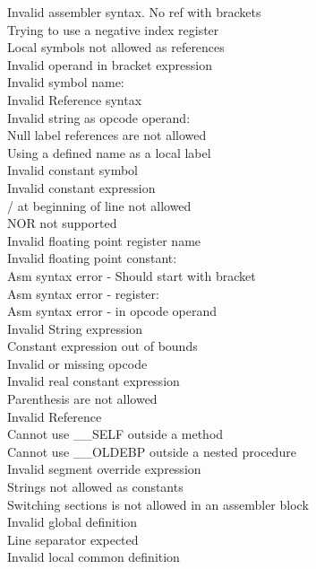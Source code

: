 \begin{description}
\item [Invalid assembler syntax. No ref with brackets]
\item [ Trying to use a negative index register ]
\item [ Local symbols not allowed as references ]
\item [ Invalid operand in bracket expression ]
\item [ Invalid symbol name:  ]
\item [ Invalid Reference syntax ]
\item [ Invalid string as opcode operand: ]
\item [ Null label references are not allowed ]
\item [ Using a defined name as a local label ]
\item [ Invalid constant symbol  ]
\item [ Invalid constant expression ]
\item [ / at beginning of line not allowed ]
\item [ NOR not supported ]
\item [ Invalid floating point register name ]
\item [ Invalid floating point constant:  ]
\item [ Asm syntax error - Should start with bracket ]
\item [ Asm syntax error - register:  ]
\item [ Asm syntax error - in opcode operand ]
\item [ Invalid String expression ]
\item [ Constant expression out of bounds ]
\item [ Invalid or missing opcode ]
\item [ Invalid real constant expression ]
\item [ Parenthesis are not allowed ]
\item [ Invalid Reference ]
\item [ Cannot use \_\_SELF outside a method ]
\item [ Cannot use \_\_OLDEBP outside a nested procedure ]
\item [ Invalid segment override expression ]
\item [ Strings not allowed as constants ]
\item [ Switching sections is not allowed in an assembler block ]
\item [ Invalid global definition ]
\item [ Line separator expected ]
\item [ Invalid local common definition ]

\end{description}
